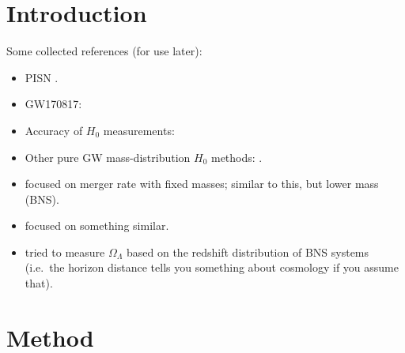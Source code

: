 \documentclass[modern]{aastex62}
\begin{document}
\section{Introduction}

Some collected references (for use later):

\begin{itemize}
  \item \ac{PISN} \cite{Heger2002,Belczynski2016,Woosley2017,Spera2017}.
  \item GW170817: \cite{GW170817,GW170817-H0}
  \item Accuracy of $H_0$ measurements: \cite{GW170817-H0,Chen2017}
  \item Other pure GW mass-distribution $H_0$ methods: \citet{Taylor2012,Messenger2012}.
  \item \citet{Chernoff1993} focused on merger rate with fixed masses; similar to this, but lower mass (BNS).
  \item \citet{Finn1996} focused on something similar.
  \item \citet{Wang1997} tried to measure $\Omega_\Lambda$ based on the redshift distribution of BNS systems (i.e.\ the horizon distance tells you something about cosmology if you assume that).
\end{itemize}

\section{Method}
\label{sec:method}
\end{document}
